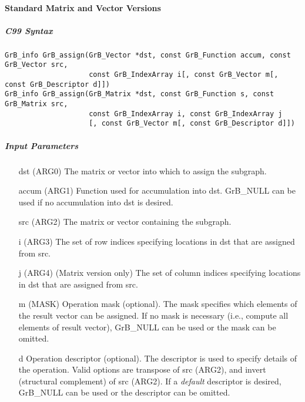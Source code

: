 \paragraph{Standard Matrix and Vector Versions}

\subparagraph{C99 Syntax}

\begin{verbatim}
GrB_info GrB_assign(GrB_Vector *dst, const GrB_Function accum, const GrB_Vector src,
                    const GrB_IndexArray i[, const GrB_Vector m[, const GrB_Descriptor d]])
GrB_info GrB_assign(GrB_Matrix *dst, const GrB_Function s, const GrB_Matrix src,
                    const GrB_IndexArray i, const GrB_IndexArray j
                    [, const GrB_Vector m[, const GrB_Descriptor d]])
\end{verbatim}

\subparagraph{Input Parameters}

\begin{itemize}
	\item[{\sf dst}]   ({\sf ARG0}) The matrix or vector into which to assign the subgraph.
	\item[{\sf accum}] ({\sf ARG1}) Function used for accumulation into dst.  {\sf GrB\_NULL}
                       can be used if no accumulation into dst is desired.
	\item[{\sf src}]   ({\sf ARG2}) The matrix or vector containing the subgraph.
	\item[{\sf i}]     ({\sf ARG3}) The set of row indices specifying locations in dst that
                       are assigned from src.
	\item[{\sf j}]     ({\sf ARG4}) (Matrix version only) The set of column indices specifying
                       locations in dst that are assigned from src.

	\item[{\sf m}]     ({\sf MASK}) Operation mask (optional). The mask
	specifies which elements of the result vector can be assigned.
	If no mask is necessary (i.e., compute all elements of result
	vector), {\sf GrB\_NULL} can be used or the mask can be omitted.

	\item[{\sf d}] Operation descriptor (optional). The descriptor
    is used to specify details of the operation. Valid options are transpose
    of src (ARG2), and invert (structural complement) of src (ARG2). If
    a \emph{default} descriptor is desired,	{\sf GrB\_NULL} can be
    used or the descriptor can be omitted.
\end{itemize}

